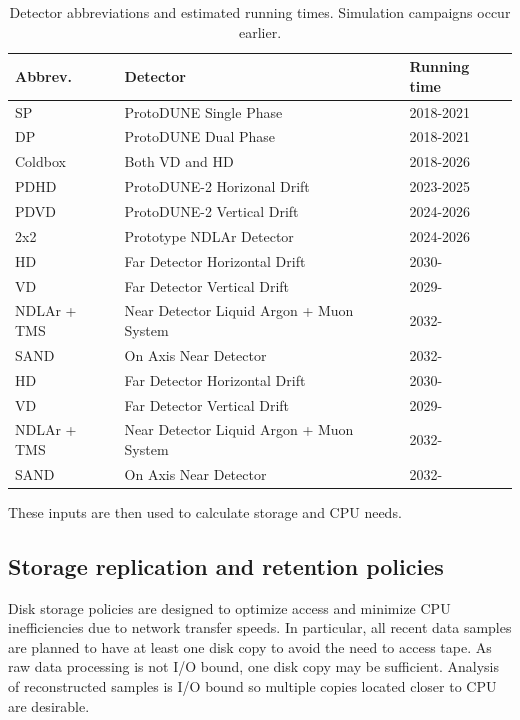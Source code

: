 \documentclass[12pt]{article}
\begin{document}
\begin{table}[h]
\begin{centering}
  \begin{tabular}{|l|l|l|}
     \hline
    Abbrev. & Detector & Running time\\
    \hline
    SP & ProtoDUNE Single Phase & 2018-2021\\
    DP & ProtoDUNE Dual Phase & 2018-2021\\
    Coldbox & Both VD and HD & 2018-2026\\
    PDHD & ProtoDUNE-2 Horizonal Drift & 2023-2025\\
    PDVD & ProtoDUNE-2 Vertical Drift & 2024-2026\\
    2x2& Prototype NDLAr Detector & 2024-2026\\
    HD & Far Detector Horizontal Drift & 2030-\\
    VD & Far Detector Vertical Drift & 2029-\\
    NDLAr + TMS & Near Detector Liquid Argon + Muon System & 2032-\\
    SAND & On Axis Near Detector & 2032- \\
    HD & Far Detector Horizontal Drift & 2030-\\
    VD & Far Detector Vertical Drift & 2029-\\
    NDLAr + TMS & Near Detector Liquid Argon + Muon System & 2032-\\
    SAND & On Axis Near Detector & 2032- \\
     \hline
     \end{tabular}
       \caption{Detector abbreviations and estimated running times.  Simulation campaigns occur earlier. }\label{tab:detectors}
  \end{centering}
   
     \end{table}
     
     

  These inputs are then used to calculate storage and CPU needs. 

\subsection{Storage replication and retention policies}
Disk storage policies are designed to optimize access and minimize CPU inefficiencies due to network transfer speeds.  In particular, all recent data samples are planned to have at least one disk copy to avoid the need to access tape.  As raw data processing is not I/O bound, one disk copy may be sufficient. Analysis of reconstructed samples is I/O bound so multiple copies located closer to CPU are desirable. 
\end{document}
